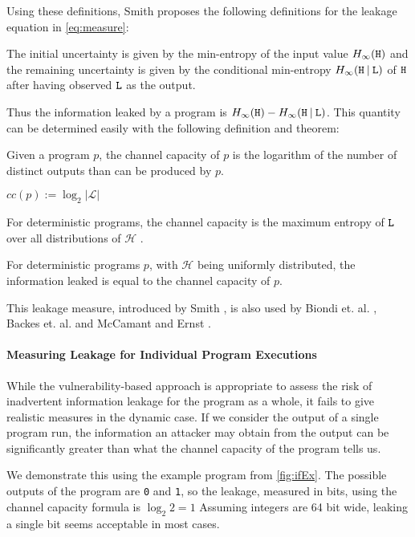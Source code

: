 Using these definitions, Smith \cite{smith09} proposes the following definitions for the leakage equation in \ref{eq:measure}:

The initial uncertainty is given by the min-entropy of the input value $H_\infty(\mathtt{H})$ and the remaining uncertainty is given by the conditional min-entropy $H_\infty(\mathtt{H} \: | \: \mathtt{L})$ of $\mathtt{H}$ after having observed $\mathtt{L}$ as the output.

Thus the information leaked by a program is $H_\infty(\mathtt{H}) - H_\infty(\mathtt{H} \: | \: \mathtt{L})$. This quantity can be determined easily with the following definition and theorem:

\begin{definition}
    Given a program $p$, the channel capacity of $p$ is the logarithm of the number of distinct outputs than can be produced by $p$.
    \begin{center}
        $cc(p) := \log_2 |\mathcal{L}|$
    \end{center}
    For deterministic programs, the channel capacity is the maximum entropy of $\mathtt{L}$ over all distributions of $\mathcal{H}$ \cite{smith09}.
\end{definition}

\begin{theorem}
    For deterministic programs $p$, with $\mathcal{H}$ being uniformly distributed, the information leaked is equal to the channel capacity of $p$.
\end{theorem}

This leakage measure, introduced by Smith \cite{smith09}, is also used by Biondi et. al. \cite{biondi18}, Backes et. al. \cite{backes09} and McCamant and Ernst \cite{mccamant08}.

\paragraph{Measuring Leakage for Individual Program Executions}
While the vulnerability-based approach is appropriate to assess the risk of inadvertent information leakage for the program as a whole, it fails to give realistic measures in the dynamic case. If we consider the output of a single program run, the information an attacker may obtain from the output can be significantly greater than what the channel capacity of the program tells us.

We demonstrate this using the example program from \ref{fig:ifEx}. The possible outputs of the program are \texttt{0} and \texttt{1}, so the leakage, measured in bits, using the channel capacity formula is $\log_2 2 = 1$ Assuming integers are 64 bit wide, leaking a single bit seems acceptable in most cases.

